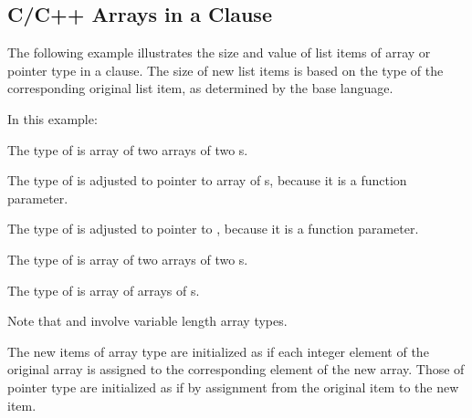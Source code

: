 \begin{ccppspecific}[4ex]
\section{C/C++ Arrays in a  Clause}
\label{sec:carrays_fpriv}

The following example illustrates the size and value of list items of array or 
pointer type in a  clause. The size of new list items is 
based on the type of the corresponding original list item, as determined by the 
base language.

In this example:

\begin{compactitem}
\item The type of  is array of two arrays of two s.

\item  The type of  is adjusted to pointer to array of  
s, because it is a function parameter.

\item  The type of  is adjusted to pointer to , because 
it is a function parameter.

\item  The type of  is array of two arrays of two s.

\item  The type of  is array of  arrays of  
s.
\end{compactitem}

Note that   and  involve variable length array types.

The new items of array type are initialized as if each integer element of the original 
array is assigned to the corresponding element of the new array. Those of pointer 
type are initialized as if by assignment from the original item to the new item.

\end{ccppspecific}


